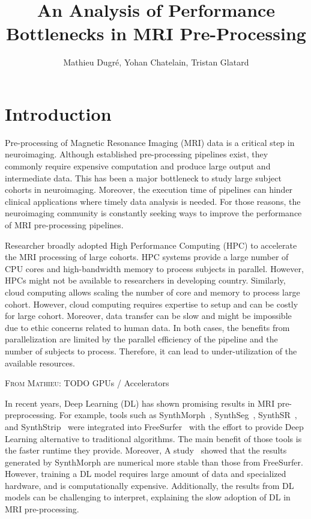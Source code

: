 \documentclass[conference]{IEEEtran}
\title{An Analysis of Performance Bottlenecks in MRI Pre-Processing}
\author{Mathieu Dugr\'e, Yohan Chatelain, Tristan Glatard}
\newcommand{\MD}[1]{\color{magenta}\textsc{From Mathieu: }#1\color{black}}
\begin{document}
\maketitle

\begin{abstract}
\end{abstract}

\section{Introduction}
Pre-processing of Magnetic Resonance Imaging (MRI) data is a critical step in neuroimaging. Although established pre-processing pipelines exist, they commonly require expensive computation and produce large output and intermediate data. This has been a major bottleneck to study large subject cohorts in neuroimaging. Moreover, the execution time of pipelines can hinder clinical applications where timely data analysis is needed. For those reasons, the neuroimaging community is constantly seeking ways to improve the performance of MRI pre-processing pipelines.

Researcher broadly adopted High Performance Computing (HPC) to accelerate the MRI processing of large cohorts. HPC systems provide a large number of CPU cores and high-bandwidth memory to process subjects in parallel. However, HPCs might not be available to researchers in developing country. Similarly, cloud computing allows scaling the number of core and memory to process large cohort. However, cloud computing requires expertise to setup and can be costly for large cohort. Moreover, data transfer can be slow and might be impossible due to ethic concerns related to human data. In both cases, the benefits from parallelization are limited by the parallel efficiency of the pipeline and the number of subjects to process. Therefore, it can lead to under-utilization of the available resources.

\MD{TODO GPUs / Accelerators}

In recent years, Deep Learning (DL) has shown promising results in MRI pre-preprocessing. For example, tools such as SynthMorph~\cite{Hoffmann2022-hu}, SynthSeg~\cite{Billot2023-vp}, SynthSR~\cite{Iglesias2023-bp}, and SynthStrip~\cite{Hoopes2022-ms} were integrated into FreeSurfer~\cite{Fischl2012-cx} with the effort to provide Deep Learning alternative to traditional algorithms. The main benefit of those tools is the faster runtime they provide. Moreover, A study~\cite{Pepe2023-dm} showed that the results generated by SynthMorph are numerical more stable than those from FreeSurfer. However, training a DL model requires large amount of data and specialized hardware, and is computationally expensive. Additionally, the results from DL models can be challenging to interpret, explaining the slow adoption of DL in MRI pre-processing.
\end{document}
